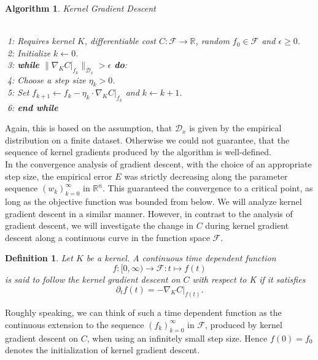 \documentclass[11pt, a4paper]{article}
\newtheorem{definition}[theorem]{Definition}
\newtheorem{algorithm}[theorem]{Algorithm}
\newcommand{\R}{\mathbb{R}}
\newcommand{\D}{\mathcal{D}}
\newcommand{\F}{\mathcal{F}}
\begin{document}
\begin{algorithm}
\caption{Kernel Gradient Descent} \ \\
\textcolor{white}{$\Big |$}1: Requires kernel $K$, differentiable cost $C: \F \to \R$, random $f_0 \in \F$ and $\epsilon \geq 0$. \\
\textcolor{white}{$\Big |$}2: Initialize $k \leftarrow 0$. \\
\textcolor{white}{$\Big |$}3: \textbf{while} $\big \| \nabla_K C |_{f_k} \big \|_{\D_x} > \epsilon$ \textbf{do}: \\
\textcolor{white}{$\Big |$}4: \quad Choose a step size $\eta_k > 0$. \\
\textcolor{white}{$\Big |$}5: \quad Set $f_{k+1} \leftarrow f_k - \eta_k \cdot \nabla_ K C |_{f_k}$ and $k \leftarrow k+1$. \\
\textcolor{white}{$\Big |$}6: \textbf{end while}
\end {algorithm}

Again, this is based on the assumption, that  $\D_x$ is given by the empirical distribution on a finite dataset. Otherwise we could not guarantee, that the sequence of kernel gradients produced by the algorithm is well-defined. \\

In the convergence analysis of gradient descent, with the choice of an appropriate step size, the empirical error $E$ was strictly decreasing along the parameter sequence $(w_k)_{k=0}^\infty$ in $\R^n$. This guaranteed the convergence to a critical point, as long as the objective function was bounded from below. We will analyze kernel gradient descent in a similar manner. However, in contrast to the analysis of gradient descent, we will investigate the change in $C$ during kernel gradient descent along a continuous curve in the function space $\F$. 

\begin{definition}
Let $K$ be a kernel. A continuous time dependent function 
\[ f : [0, \infty) \to \F : t \mapsto f(t) \]
is said to follow the kernel gradient descent on $C$ with respect to K if it satisfies
\[ \partial_tf(t) = - \nabla_KC|_{f(t)}. \]
\end{definition}

Roughly speaking, we can think of such a time dependent function as the continuous extension to the sequence $(f_k)_{k=0}^\infty$ in $\F$, produced by kernel gradient descent on $C$, when using an infinitely small step size. Hence $f(0) = f_0$ denotes the initialization of kernel gradient descent. \\
\end{document}
